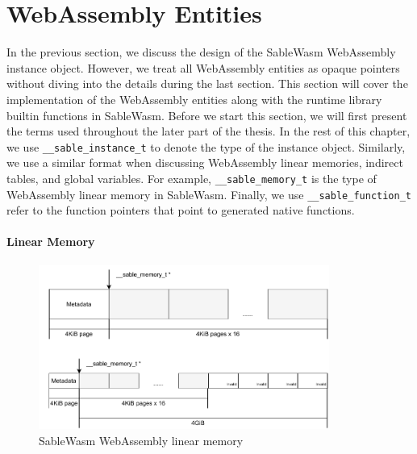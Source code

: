 \section{WebAssembly Entities}

In the previous section, we discuss the design of the SableWasm WebAssembly
instance object. However, we treat all WebAssembly entities as opaque pointers
without diving into the details during the last section. This section will cover
the implementation of the WebAssembly entities along with the runtime library
builtin functions in SableWasm. Before we start this section, we will first
present the terms used throughout the later part of the thesis. In the rest of
this chapter, we use \texttt{\_\_sable\_instance\_t} to denote the type of the
instance object. Similarly, we use a similar format when discussing WebAssembly
linear memories, indirect tables, and global variables. For example,
\texttt{\_\_sable\_memory\_t} is the type of WebAssembly linear memory in
SableWasm. Finally, we use \texttt{\_\_sable\_function\_t} refer to the function
pointers that point to generated native functions.

\paragraph{Linear Memory}

\begin{figure}
    \centering
    \includegraphics[width=0.85\textwidth]{Images/5.Backend and Runtime/memory}
    \caption{SableWasm WebAssembly linear memory}
    \label{fig:backend-memory}
\end{figure}

